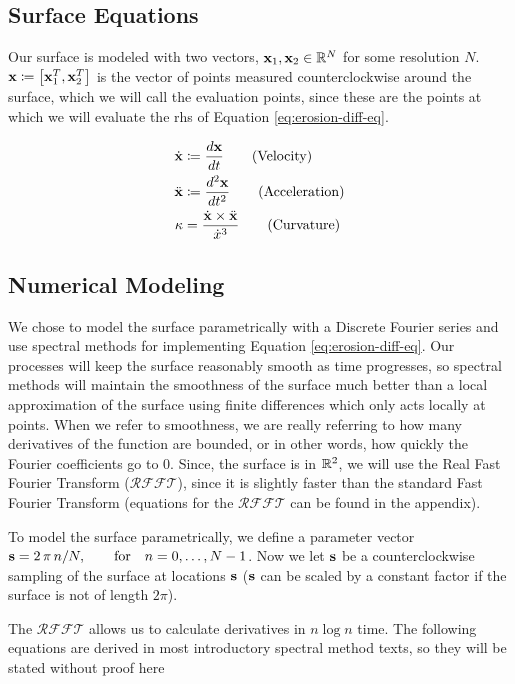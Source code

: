 \subsection*{Surface Equations}

Our surface is modeled with two vectors, $\mathbf{x}_1, \mathbf{x}_2 \in \mathbb R^N$ for some resolution $N$. $\bvec{x} \coloneqq \bracket{\bvec{x}_1^T, \bvec{x}_2^T}$ is the vector of points measured counterclockwise around the surface, which we will call the evaluation points, since these are the points at which we will evaluate the rhs of Equation \ref{eq:erosion-diff-eq}.

\begin{align}
  \dot{\mathbf{x}}& \coloneqq \frac{d\mathbf{x}}{dt} \tag{Velocity}\\
  \ddot{\mathbf{x}}& \coloneqq \frac{d^2\mathbf{x}}{dt^2} \tag{Acceleration}\\
  \kappa& = \frac{\dot{\mathbf{x}} \times \ddot{\mathbf{x}}}{\dot{x}^3} \tag{Curvature}
\end{align}

\subsection*{Numerical Modeling}

We chose to model the surface parametrically with a Discrete Fourier series and use spectral methods for implementing Equation \ref{eq:erosion-diff-eq}. Our processes will keep the surface reasonably smooth as time progresses, so spectral methods will maintain the smoothness of the surface much better than a local approximation of the surface using finite differences which only acts locally at points. When we refer to smoothness, we are really referring to how many derivatives of the function are bounded, or in other words, how quickly the Fourier coefficients go to $0$. Since, the surface is in $\mathbb R^2$, we will use the Real Fast Fourier Transform ($\mathcal{RFFT}$), since it is slightly faster than the standard Fast Fourier Transform (equations for the $\mathcal{RFFT}$ can be found in the appendix). 

To model the surface parametrically, we define a parameter vector $\mathbf{s} = 2 \, \pi \, n / N, \qquad \text{for} \quad n = 0, \dotsc, N-1$. Now we let $\mathbf{s}$ be a counterclockwise sampling of the surface at locations $\mathbf{s}$ ($\mathbf{s}$ can be scaled by a constant factor if the surface is not of length $2\pi$).

The $\mathcal{RFFT}$ allows us to calculate derivatives in $n \log{n}$ time. The following equations are derived in most introductory spectral method texts, so they will be stated without proof here

